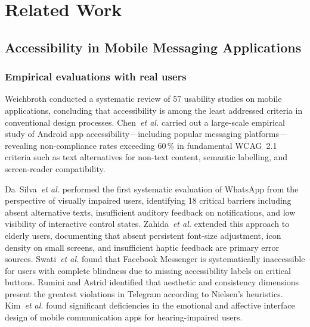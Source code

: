 \documentclass[journal]{IEEEtran}
\begin{document}
	\section{Related Work}
	\label{sec:related}
	
	\subsection{Accessibility in Mobile Messaging Applications}
	
	\subsubsection{Empirical evaluations with real users}
	Weichbroth \cite{weichbroth2020} conducted a systematic review of
	57 usability studies on mobile applications, concluding that
	accessibility is among the least addressed criteria in conventional
	design processes.
	Chen~\textit{et al.} \cite{chen2022} carried out a large-scale
	empirical study of Android app accessibility---including popular
	messaging platforms---revealing non-compliance rates exceeding
	60\,\% in fundamental WCAG~2.1 criteria such as text alternatives
	for non-text content, semantic labelling, and screen-reader
	compatibility.
	
	Da~Silva~\textit{et al.} \cite{dasilva2016} performed the first
	systematic evaluation of WhatsApp from the perspective of visually
	impaired users, identifying 18 critical barriers including
	absent alternative texts, insufficient auditory feedback on
	notifications, and low visibility of interactive control states.
	Zahida~\textit{et al.} \cite{zahida2021} extended this approach
	to elderly users, documenting that absent persistent font-size
	adjustment, icon density on small screens, and insufficient
	haptic feedback are primary error sources.
	Swati~\textit{et al.} \cite{swati2021} found that Facebook
	Messenger is systematically inaccessible for users with complete
	blindness due to missing accessibility labels on critical buttons.
	Rumini and Astrid \cite{rumini2019} identified that aesthetic and
	consistency dimensions present the greatest violations in
	Telegram according to Nielsen's heuristics.
	Kim~\textit{et al.} \cite{kim2024} found significant deficiencies
	in the emotional and affective interface design of mobile
	communication apps for hearing-impaired users.
	
\end{document}
